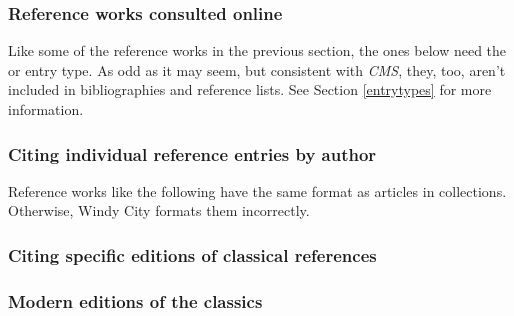 \documentclass[11pt,letterpaper,oneside]{article}
\begin{document}
\subsubsection{Reference works consulted online}
\label{14.233}

Like some of the reference works in the previous section, the ones
below need the  or  entry
type. As odd as it may seem, but consistent with \textit{CMS}, they,
too, aren't included in bibliographies and reference lists. See
Section \ref{entrytypes} for more information.

\begin{citeonly}
\item \cite{toscanini2016}
\item \cite{cairns2016}
\item \cite{wikipedia2016}
\item \cite{merriam2016}
\end{citeonly}

\subsubsection{Citing individual reference entries by author}

Reference works like the following have the same format as articles in
collections. Otherwise, Windy City formats them incorrectly.

\begin{citebib}
\item \cite{isaacson2005}
\end{citebib}

\setcounter{subsubsection}{245}
\subsubsection{Citing specific editions of classical references}

\begin{citebib}
\item \cite{epictetus1916}
\end{citebib}

\setcounter{subsubsection}{250}
\subsubsection{Modern editions of the classics}
\end{document}
